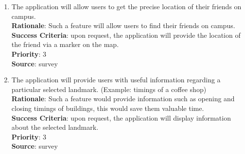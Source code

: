\documentclass[10pt,a4paper,oneside]{report}
\begin{document}
{\begin{enumerate}
\item{The application will allow users to get the precise location of their friends on campus.\\
  \textbf{Rationale}: Such a feature will allow users to find their friends on campus.\\
  \textbf{Success Criteria}: upon request, the application will provide the location of the friend via a marker on the map.\\
  \textbf{Priority}: 3\\
  \textbf{Source}: survey
}

\item{The application will provide users with useful  information regarding a particular selected landmark. (Example: timings of a coffee shop)\\
  \textbf{Rationale}: Such a feature would provide information such as opening and closing timings of buildings, this would save them valuable time.\\
  \textbf{Success Criteria}: upon request, the application will display information about the selected landmark.\\
  \textbf{Priority}: 3\\
  \textbf{Source}: survey
}
\end{enumerate}
}
\end{document}
